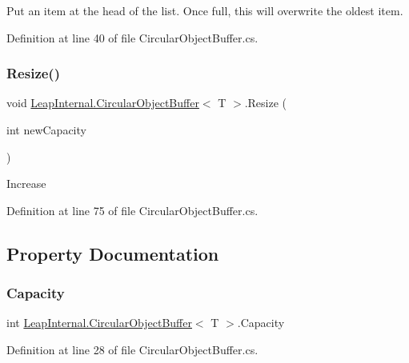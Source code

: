 Put an item at the head of the list. Once full, this will overwrite the oldest item. 

Definition at line 40 of file Circular\+Object\+Buffer.\+cs.

\mbox{\label{class_leap_internal_1_1_circular_object_buffer_a96e1c0d42e5ae980a605f69ac4565322}} 
\subsubsection{\texorpdfstring{Resize()}{Resize()}}
{\footnotesize\ttfamily void \mbox{\hyperlink{class_leap_internal_1_1_circular_object_buffer}{Leap\+Internal.\+Circular\+Object\+Buffer}}$<$ T $>$.Resize (\begin{DoxyParamCaption}\item[{int}]{new\+Capacity }\end{DoxyParamCaption})}

Increase 

Definition at line 75 of file Circular\+Object\+Buffer.\+cs.



\subsection{Property Documentation}
\mbox{\label{class_leap_internal_1_1_circular_object_buffer_ae41572e934feeb6effe84c31a24521ae}} 
\subsubsection{\texorpdfstring{Capacity}{Capacity}}
{\footnotesize\ttfamily int \mbox{\hyperlink{class_leap_internal_1_1_circular_object_buffer}{Leap\+Internal.\+Circular\+Object\+Buffer}}$<$ T $>$.Capacity\hspace{0.3cm}{\ttfamily [get]}}



Definition at line 28 of file Circular\+Object\+Buffer.\+cs.

